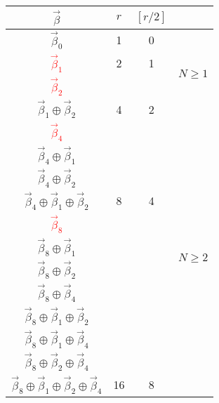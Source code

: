\begin{table}[t]
\centering
\begin{tabular}{|c|c|c|c|}
\hline 
$\vec{\beta}$ & $r$ & $[r/2]$ &                  \\ \hline \hline
 \cellcolor{gray} $\vec{\beta}_{0}$ & \cellcolor{gray} 1 & \cellcolor{gray} 0 & \multirow{4}{*}{$N\geq 1$} \\ \cline{1-3}
\cellcolor{lightgray}\textcolor{red}{$\vec{\beta}_{1}$} & \cellcolor{lightgray} 2 & \cellcolor{lightgray}1 &                    \\ \cline{1-3}
\textcolor{red}{$\vec{\beta}_{2}$} &  &  &                    \\ %
\cellcolor{lightgray} $\vec{\beta}_{1}\oplus\vec{\beta}_{2}$ & \cellcolor{lightgray}4 & \cellcolor{lightgray}2 &                    \\ \hline\hline
\textcolor{red}{$\vec{\beta}_{4}$} &  &  &  \multirow{12}{*}{$N\geq 2$}                      \\ %
$\vec{\beta}_{4}\oplus\vec{\beta}_{1}$ &  &  &                    \\ %
$\vec{\beta}_{4}\oplus\vec{\beta}_{2}$ &  &  &                    \\ %
\cellcolor{lightgray} $\vec{\beta}_{4}\oplus\vec{\beta}_{1}\oplus\vec{\beta}_{2}$ & \cellcolor{lightgray} 8 & \cellcolor{lightgray} 4 &                    \\ \cline{1-3}
\textcolor{red}{$\vec{\beta}_{8}$} &  &  &                    \\ %
$\vec{\beta}_{8}\oplus\vec{\beta}_{1}$ &  &  &                    \\ %
$\vec{\beta}_{8}\oplus\vec{\beta}_{2}$ &  &  &                    \\ %
$\vec{\beta}_{8}\oplus\vec{\beta}_{4}$ &  &  &                    \\ %
$\vec{\beta}_{8}\oplus\vec{\beta}_{1}\oplus\vec{\beta}_{2}$ &  &  &                    \\ %
$\vec{\beta}_{8}\oplus\vec{\beta}_{1}\oplus\vec{\beta}_{4}$ &  &  &                    \\ %
$\vec{\beta}_{8}\oplus\vec{\beta}_{2}\oplus\vec{\beta}_{4}$ &  &  &                    \\ %
\cellcolor{lightgray} $\vec{\beta}_{8}\oplus\vec{\beta}_{1}\oplus\vec{\beta}_{2}\oplus\vec{\beta}_{4}$ & \cellcolor{lightgray} 16 & \cellcolor{lightgray} 8 &                    \\ %
\hline \hline

\end{tabular}
\end{table}
